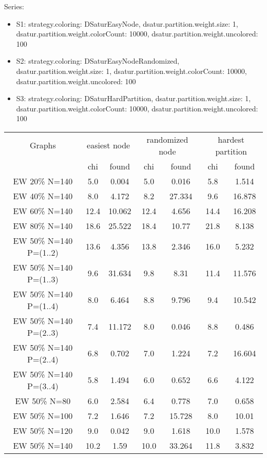 \documentclass[landscape, 12pt]{report}
\begin{document}
	Series:
	\begin{itemize}
	\item S1: strategy.coloring: DSaturEasyNode, dsatur.partition.weight.size: 1, dsatur.partition.weight.colorCount: 10000, dsatur.partition.weight.uncolored: 100
	\item S2: strategy.coloring: DSaturEasyNodeRandomized, dsatur.partition.weight.size: 1, dsatur.partition.weight.colorCount: 10000, dsatur.partition.weight.uncolored: 100
	\item S3: strategy.coloring: DSaturHardPartition, dsatur.partition.weight.size: 1, dsatur.partition.weight.colorCount: 10000, dsatur.partition.weight.uncolored: 100
	\end{itemize}
	\begin{tabular}{|c|cc|cc|cc|}
	\hline
	\multicolumn{1}{|c|}{Graphs} & \multicolumn{2}{|c|}{easiest node} & \multicolumn{2}{|c|}{randomized node} & \multicolumn{2}{|c|}{hardest partition}
	\\
	 & chi & found & chi & found & chi & found
	\\
	\hline
	EW 20\% N=140 &  5.0 & 0.004 &  5.0 & 0.016 &  5.8 & 1.514
	\\
	EW 40\% N=140 &  8.0 & 4.172 &  8.2 & 27.334 &  9.6 & 16.878
	\\
	EW 60\% N=140 & 12.4 & 10.062 & 12.4 & 4.656 & 14.4 & 16.208
	\\
	EW 80\% N=140 & 18.6 & 25.522 & 18.4 & 10.77 & 21.8 & 8.138
	\\
	\hline
	EW 50\% N=140 P=(1..2) & 13.6 & 4.356 & 13.8 & 2.346 & 16.0 & 5.232
	\\
	EW 50\% N=140 P=(1..3) &  9.6 & 31.634 &  9.8 & 8.31 & 11.4 & 11.576
	\\
	EW 50\% N=140 P=(1..4) &  8.0 & 6.464 &  8.8 & 9.796 &  9.4 & 10.542
	\\
	EW 50\% N=140 P=(2..3) &  7.4 & 11.172 &  8.0 & 0.046 &  8.8 & 0.486
	\\
	EW 50\% N=140 P=(2..4) &  6.8 & 0.702 &  7.0 & 1.224 &  7.2 & 16.604
	\\
	EW 50\% N=140 P=(3..4) &  5.8 & 1.494 &  6.0 & 0.652 &  6.6 & 4.122
	\\
	\hline
	EW 50\% N=80 &  6.0 & 2.584 &  6.4 & 0.778 &  7.0 & 0.658
	\\
	EW 50\% N=100 &  7.2 & 1.646 &  7.2 & 15.728 &  8.0 & 10.01
	\\
	EW 50\% N=120 &  9.0 & 0.042 &  9.0 & 1.618 & 10.0 & 1.578
	\\
	EW 50\% N=140 & 10.2 & 1.59 & 10.0 & 33.264 & 11.8 & 3.832
	\\

\end{tabular}
\end{document}
